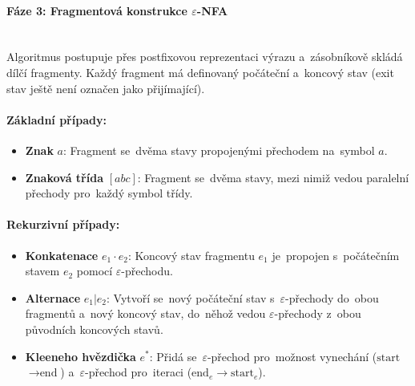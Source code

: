\documentclass[
  master,
  program=ainfvs,
  printversion,
  figures=false,
  tables=false,
  glossaries,
  index
]{kidiplom}
\begin{document}
\paragraph{Fáze 3: Fragmentová konstrukce $\varepsilon$-NFA} \mbox{} \\
Algoritmus postupuje přes postfixovou reprezentaci výrazu a~zásobníkově skládá dílčí fragmenty. Každý fragment má definovaný počáteční a~koncový stav (exit stav ještě není označen jako přijímající).

\paragraph{Základní případy:}
\begin{itemize}
    \item \textbf{Znak} $a$: Fragment se~dvěma stavy propojenými přechodem na~symbol $a$.
    \item \textbf{Znaková třída} $[abc]$: Fragment se~dvěma stavy, mezi nimiž vedou paralelní přechody pro~každý symbol třídy.
\end{itemize}

\paragraph{Rekurzivní případy:}
\begin{itemize}
    \item \textbf{Konkatenace} $e_1 \cdot e_2$: Koncový stav fragmentu $e_1$ je~propojen s~počátečním stavem $e_2$ pomocí $\varepsilon$-přechodu.
    \item \textbf{Alternace} $e_1 | e_2$: Vytvoří se~nový počáteční stav s~$\varepsilon$-přechody do~obou fragmentů a~nový koncový stav, do~něhož vedou $\varepsilon$-přechody z~obou původních koncových stavů.
    \item \textbf{Kleeneho hvězdička} $e^*$: Přidá se~$\varepsilon$-přechod pro~možnost vynechání ($\text{start}$ $\to \text{end}$) a~$\varepsilon$-přechod pro~iteraci ($\text{end}_e \to \text{start}_e$).
\end{itemize}
\end{document}
